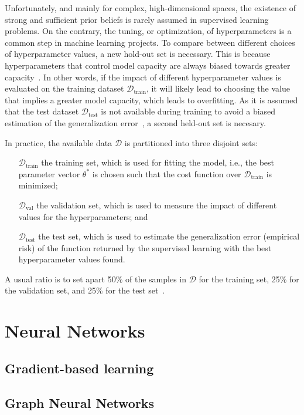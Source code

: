 Unfortunately, and mainly for complex, high-dimensional spaces, the existence of strong and sufficient prior beliefs is rarely assumed in supervised learning problems.
On the contrary, the tuning, or optimization, of hyperparameters is a common step in machine learning projects.
To compare between different choices of hyperparameter values, a new hold-out set is necessary.
This is because hyperparameters that control model capacity are always biased towards greater capacity~\cite{Goodfellow-et-al-2016}.
In other words, if the impact of different hyperparameter values is evaluated on the training dataset $\mathcal{D}_\textrm{train}$, it will likely lead to choosing the value that implies a greater model capacity, which leads to overfitting.
As it is assumed that the test dataset $\mathcal{D}_\textrm{test}$ is not available during training to avoid a biased estimation of the generalization error~\cite{murphyMachineLearningProbabilistic2013}, a second held-out set is necesary.

In practice, the available data $\mathcal{D}$ is partitioned into three disjoint sets:
\begin{itemize}
    \item[$\mathcal{D}_\textrm{train}$] the training set, which is used for fitting the model, i.e., the best parameter vector $\theta^*$ is chosen such that the cost function over $\mathcal{D}_\textrm{train}$ is minimized;
    \item[$\mathcal{D}_\textrm{val}$] the validation set, which is used to measure the impact of different values for the hyperparameters; and
    \item[$\mathcal{D}_\textrm{test}$] the test set, which is used to estimate the generalization error (empirical risk) of the function returned by the supervised learning with the best hyperparameter values found.
\end{itemize}
A usual ratio is to set apart 50\% of the samples in $\mathcal{D}$ for the training set, 25\% for the validation set, and 25\% for the test set~\cite{hastieElementsStatisticalLearning2009}.

\section{Neural Networks}

\subsection{Gradient-based learning}


\subsection{Graph Neural Networks}


